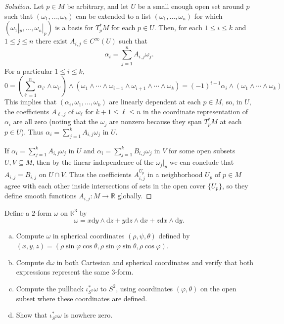 \documentclass[10pt]{article}
\newcommand{\dd}{\mathrm{d}}
\providecommand{\RR}{\mathbb R}
\providecommand{\ii}{\item}
\newenvironment{soln}{\begin{proof}[Solution]}{\end{proof}}
\begin{document}
\begin{soln}
    Let $p\in M$ be arbitrary,
    and let $U$ be a small enough open set around $p$
    such that $(\omega_1,\dots,\omega_k)$ can be extended to
    a list $(\omega_1,\dots,\omega_n)$ for which
    $(\omega_1|_p,\dots,\omega_n|_p)$ is a basis for $T^*_pM$
    for each $p\in U$. Then, for each $1\le i\le k$ and $1\le j\le n$
    there exist $A_{i,j}\in C^\infty(U)$ such that
    \begin{equation*}
	\alpha_i = \sum_{j=1}^nA_{i,j}\omega_j.
    \end{equation*}
    For a particular $1\le i\le k$,
    \begin{equation*}
	0 = \left(\sum_{i'=1}^n\alpha_{i'}\wedge\omega_{i'}\right)
	\wedge(\omega_1\wedge\cdots\wedge\omega_{i-1}
	\wedge\omega_{i+1}\wedge\cdots\wedge\omega_k)
	= (-1)^{i-1}\alpha_i\wedge(\omega_1\wedge\cdots\wedge\omega_k)
    \end{equation*}
    This implies that $(\alpha_i,\omega_1,\dots,\omega_k)$
    are linearly dependent at each $p\in M$,
    so, in $U$, the coefficients $A_{\ell,j}$ of $\omega_\ell$
    for $k+1\le\ell\le n$ in the coordinate representation
    of $\alpha_i$ are all zero (noting that the $\omega_j$
    are nonzero because they span $T^*_pM$ at each $p\in U$).
    Thus $\alpha_i = \sum_{j=1}^k A_{i,j}\omega_j$ in $U$.

    If $\alpha_i = \sum_{j=1}^k A_{i,j}\omega_j$ in $U$
    and $\alpha_i = \sum_{j=1}^k B_{i,j}\omega_j$ in $V$
    for some open subsets $U,V\subseteq M$,
    then by the linear independence of the $\omega_j|_p$
    we can conclude that $A_{i,j} = B_{i,j}$ on $U\cap V$.
    Thus the coefficients $A_{i,j}^{U_p}$ in a neighborhood $U_p$ of $p\in M$
    agree with each other inside intersections of sets
    in the open cover $\{U_p\}$, so they define smooth functions
    $A_{i,j}\colon M\to\RR$ globally.
\end{soln}

\begin{problem}
    [14-6]
    Define a $2$-form $\omega$ on $\RR^3$ by
    \begin{equation*}
        \omega = x\dd y\wedge\dd z + y\dd z \wedge\dd x + z\dd x\wedge\dd y.
    \end{equation*}
    \begin{enumerate}[(a)]
        \ii Compute $\omega$ in spherical coordinates
	$(\rho,\psi,\theta)$ defined by $(x,y,z)
	= (\rho\sin\varphi\cos\theta,
	\rho\sin\varphi\sin\theta,
	\rho\cos\varphi)$.
	\ii Compute $\dd\omega$ in both Cartesian and spherical coordinates
	and verify that both expressions represent the same $3$-form.
	\ii Compute the pullback $\iota^*_{S^2}\omega$ to $S^2$,
	using coordinates $(\varphi,\theta)$ on
	the open subset where these coordinates are defined.
	\ii Show that $\iota^*_{S^2}\omega$ is nowhere zero.
    \end{enumerate}
\end{problem}
\end{document}
